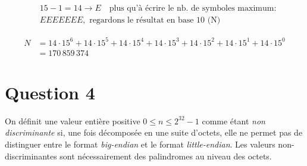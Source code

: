 \documentclass{article}
\begin{document}
\begin{flushleft}
\[
\begin{aligned}
&15 - 1 = 14 \rightarrow E \quad \text{plus qu'à écrire le nb. de symboles maximum:} \\
& EEEEEEE\text{,} \,\,\, \text{regardons le résultat en base 10 (N)}
\end{aligned}
\]
\end{flushleft}

\[
\begin{aligned}
N &= 14 \cdot 15^6 + 14 \cdot 15^5 + 14 \cdot 15^4 + 14 \cdot 15^3 + 14 \cdot 15^2 + 14 \cdot 15^1 + 14 \cdot 15^0 \\
&= 170\,859\,374
\end{aligned}
\]

\newpage

\section*{Question 4}
On définit une valeur entière positive $0 \leq n \leq 2^{32} - 1$
comme étant \emph{non discriminante} si, une fois décomposée en une suite d’octets, 
elle ne permet pas de distinguer entre le format \emph{big-endian} et le format \emph{little-endian}. 
Les valeurs non-discriminantes sont nécessairement des palindromes au niveau des octets.
\end{document}
